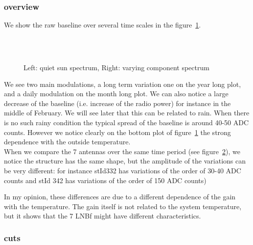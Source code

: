 \subsubsection{overview}
We  show   the  raw   baseline  over  several   time  scales   in  the
figure~\ref{fig:scales}.
\begin{figure}[!ht]
  \centering
  \hspace*{-3ex}
  \\
  \\
  \caption{Left: quiet sun spectrum, Right: varying component spectrum}
  \label{fig:scales}
\end{figure}
We see  two main modulations,  a long term  variation one on  the year
long plot, and a daily modulation  on the month long plot. We can also
notice a  large decrease of the  baseline (i.e. increase  of the radio
power) for instance in the middle  of February. We will see later that
this can be related to rain. When there is no such rainy condition the
typical spread of the baseline  is around 40-50 ADC counts. However we
notice  clearly  on the  bottom  plot  of figure~\ref{fig:scales}  the
strong dependence with the outside temperature. \\ When we compare the
7     antennas     over      the     same     time     period     (see
figure~\ref{fig:allantennas}),  we notice the  structure has  the same
shape, but the amplitude of  the variations can be very different: for
instance stId332 has  variations of the order of  30-40 ADC counts and
stId 342 has variations of the order of 150 ADC counts)
\begin{figure}[!ht]
  \centering
  \hspace*{-3ex}
  \caption{}
  \label{fig:allantennas}
\end{figure}
In my opinion, these differences  are due to a different dependence of
the gain with the temperature.  The  gain itself is not related to the
system temperature, but it shows  that the 7 LNBf might have different
characteristics.
\subsubsection{cuts}
